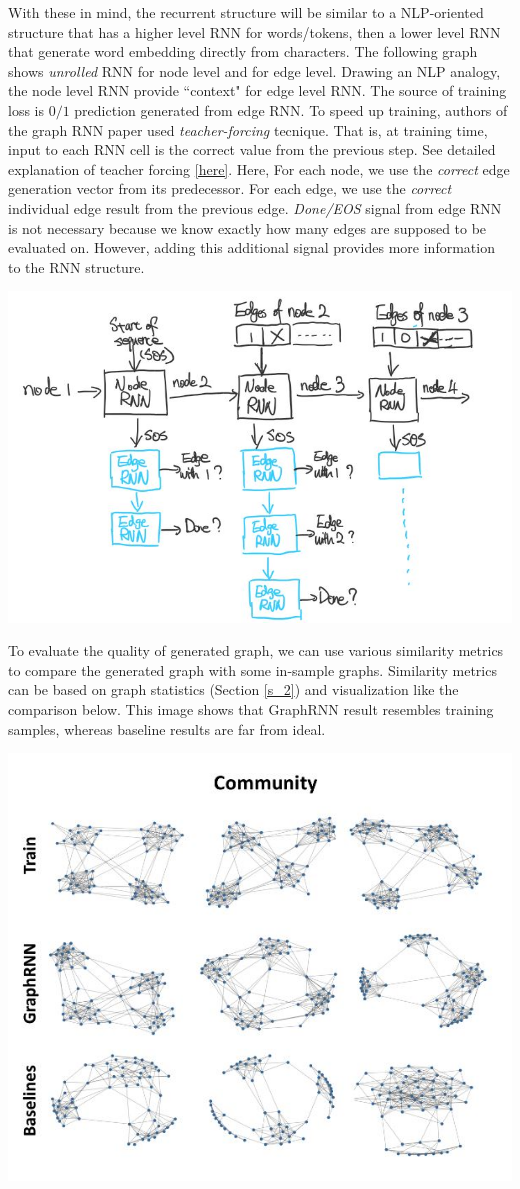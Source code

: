 With these in mind, the recurrent structure will be similar to a NLP-oriented structure that has a higher level RNN for words/tokens, then a lower level RNN that generate word embedding directly from characters. The following graph shows \textit{unrolled} RNN for node level and for edge level. Drawing an NLP analogy, the node level RNN provide ``context" for edge level RNN. The source of training loss is $0/1$ prediction generated from edge RNN. 
To speed up training, authors of the graph RNN paper used \textit{teacher-forcing} tecnique. That is, at training time, input to each RNN cell is the correct value from the previous step. See detailed explanation of teacher forcing \href{https://towardsdatascience.com/what-is-teacher-forcing-3da6217fed1c}{[here]}. Here, For each node, we use the \textit{correct} edge generation vector from its predecessor. For each edge, we use the \textit{correct} individual edge result from the previous edge. \textit{Done/EOS} signal from edge RNN is not necessary because we know exactly how many edges are supposed to be evaluated on. However, adding this additional signal provides more information to the RNN structure.

{
\centering
\includegraphics[width=0.85\linewidth]{notes/img/n6_rnn.JPG} \par
}

To evaluate the quality of generated graph, we can use various similarity metrics to compare the generated graph with some in-sample graphs. Similarity metrics can be based on graph statistics (Section \ref{s_2}) and visualization like the comparison below. This image shows that GraphRNN result resembles training samples, whereas baseline results are far from ideal.

{
\centering
\includegraphics[width=0.5\linewidth]{notes/img/n6_compare.JPG} \par
}


